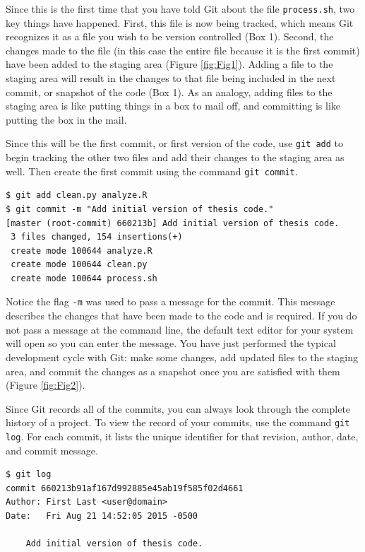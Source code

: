 \documentclass[10pt]{article}
\begin{document}
Since this is the first time that you have told Git about the file \verb|process.sh|, two key things have happened.
First, this file is now being tracked, which means Git recognizes it as a file you wish to be version controlled (Box 1).
Second, the changes made to the file (in this case the entire file because it is the first commit) have been added to the staging area (Figure \ref{fig:Fig1}).
Adding a file to the staging area will result in the changes to that file being included in the next commit, or snapshot of the code (Box 1).
As an analogy, adding files to the staging area is like putting things in a box to mail off, and committing is like putting the box in the mail.

Since this will be the first commit, or first version of the code, use \verb|git add| to begin tracking the other two files and add their changes to the staging area as well.
Then create the first commit using the command \verb|git commit|.

\begin{verbatim}
$ git add clean.py analyze.R
$ git commit -m "Add initial version of thesis code."
[master (root-commit) 660213b] Add initial version of thesis code.
 3 files changed, 154 insertions(+)
 create mode 100644 analyze.R
 create mode 100644 clean.py
 create mode 100644 process.sh
\end{verbatim}

Notice the flag \verb|-m| was used to pass a message for the commit.
This message describes the changes that have been made to the code and is required.
If you do not pass a message at the command line, the default text editor for your system will open so you can enter the message.
You have just performed the typical development cycle with Git:
make some changes, add updated files to the staging area, and commit the changes as a snapshot once you are satisfied with them (Figure \ref{fig:Fig2}).

Since Git records all of the commits, you can always look through the complete history of a project.
To view the record of your commits, use the command \verb|git log|.
For each commit, it lists the unique identifier for that revision, author, date, and commit message.

\begin{verbatim}
$ git log
commit 660213b91af167d992885e45ab19f585f02d4661
Author: First Last <user@domain>
Date:   Fri Aug 21 14:52:05 2015 -0500

    Add initial version of thesis code.
\end{verbatim}
\end{document}
